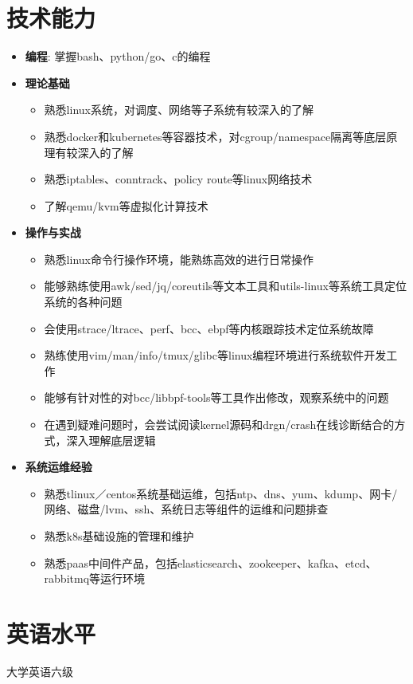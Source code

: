 \documentclass{resume}
\begin{document}
\section{技术能力}
\begin{itemize}[parsep=0.2ex]
  \item \textbf{编程}: 掌握bash、python/go、c的编程
  \item \textbf{理论基础}
    \begin{itemize}
      \item 熟悉linux系统，对调度、网络等子系统有较深入的了解
      \item 熟悉docker和kubernetes等容器技术，对cgroup/namespace隔离等底层原理有较深入的了解
      \item 熟悉iptables、conntrack、policy route等linux网络技术
      \item 了解qemu/kvm等虚拟化计算技术
    \end{itemize}
  \item \textbf{操作与实战}
    \begin{itemize}
      \item 熟悉linux命令行操作环境，能熟练高效的进行日常操作
      \item 能够熟练使用awk/sed/jq/coreutils等文本工具和utils-linux等系统工具定位系统的各种问题
      \item 会使用strace/ltrace、perf、bcc、ebpf等内核跟踪技术定位系统故障
      \item 熟练使用vim/man/info/tmux/glibc等linux编程环境进行系统软件开发工作
      \item 能够有针对性的对bcc/libbpf-tools等工具作出修改，观察系统中的问题
      \item 在遇到疑难问题时，会尝试阅读kernel源码和drgn/crash在线诊断结合的方式，深入理解底层逻辑
    \end{itemize}
  \item \textbf{系统运维经验}
    \begin{itemize}
      \item 熟悉tlinux／centos系统基础运维，包括ntp、dns、yum、kdump、网卡/网络、磁盘/lvm、ssh、系统日志等组件的运维和问题排查
      \item 熟悉k8s基础设施的管理和维护
      \item 熟悉paas中间件产品，包括elasticsearch、zookeeper、kafka、etcd、rabbitmq等运行环境
    \end{itemize}
\end{itemize}

\section{英语水平}
大学英语六级
\end{document}
